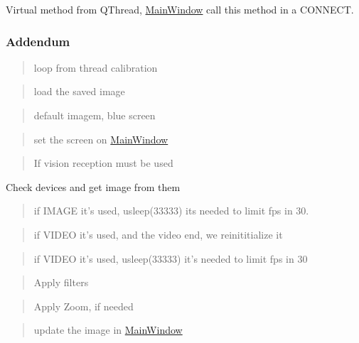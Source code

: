 Virtual method from Q\-Thread, \hyperlink{classMainWindow}{Main\-Window} call this method in a C\-O\-N\-N\-E\-C\-T. 

\subsubsection*{Addendum }

\begin{quotation}
loop from thread calibration \end{quotation}
\begin{quotation}
load the saved image \end{quotation}


\begin{quotation}
default imagem, blue screen \end{quotation}


\begin{quotation}
set the screen on \hyperlink{classMainWindow}{Main\-Window} \end{quotation}


\begin{quotation}
If vision reception must be used \end{quotation}


Check devices and get image from them

\begin{quotation}
if I\-M\-A\-G\-E it's used, usleep(33333) its needed to limit fps in 30. \end{quotation}


\begin{quotation}
if V\-I\-D\-E\-O it's used, and the video end, we reinititialize it \end{quotation}


\begin{quotation}
if V\-I\-D\-E\-O it's used, usleep(33333) it's needed to limit fps in 30 \end{quotation}


\begin{quotation}
Apply filters \end{quotation}


\begin{quotation}
Apply Zoom, if needed \end{quotation}


\begin{quotation}
update the image in \hyperlink{classMainWindow}{Main\-Window} \end{quotation}


